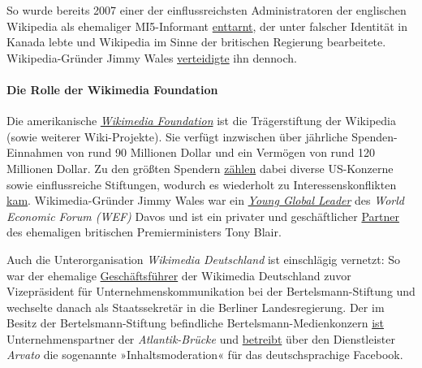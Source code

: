 So wurde bereits 2007 einer der einflussreichsten Administratoren der
englischen Wikipedia als ehemaliger MI5-Informant
\href{https://web.archive.org/web/20200528235242/http://english.ohmynews.com/articleview/article_view.asp?menu=c10400\&no=374006\&rel_no=1}{enttarnt},
der unter falscher Identität in Kanada lebte und Wikipedia im Sinne der
britischen Regierung bearbeitete. Wikipedia-Gründer Jimmy Wales
\href{https://gosint.wordpress.com/2018/06/02/wikipedia-the-spooks-the-remake-update-philip-cross-identified/}{verteidigte}
ihn dennoch.

\hypertarget{die-rolle-der-wikimedia-foundation}{%
\paragraph{Die Rolle der Wikimedia
Foundation}\label{die-rolle-der-wikimedia-foundation}}

Die amerikanische
\emph{\href{https://de.wikipedia.org/wiki/Wikimedia_Foundation}{Wikimedia
Foundation}} ist die Trägerstiftung der Wikipedia (sowie weiterer
Wiki-Projekte). Sie verfügt inzwischen über jährliche Spenden-Einnahmen
von rund 90 Millionen Dollar und ein Vermögen von rund 120 Millionen
Dollar. Zu den größten Spendern
\href{https://wikimediafoundation.org/support/benefactors/}{zählen}
dabei diverse US-Konzerne sowie einflussreiche Stiftungen, wodurch es
wiederholt zu Interessenskonflikten
\href{https://www.dailydot.com/business/wikipedia-conflict-editing-donation-benefactors/}{kam}.
Wiki­media-Gründer Jimmy Wales war ein
\href{http://reports.weforum.org/the-forum-of-young-global-leaders-2014/ygl-stories/crowdsourced/}{\emph{Young
Global Leader}} des \emph{World Economic Forum (WEF)} Davos und ist ein
privater und geschäftlicher
\href{http://wikipediocracy.com/2015/06/01/how-jimmy-wales-rode-tony-blairs-coattails/}{Partner}
des ehemaligen britischen Premierministers Tony Blair.

Auch die Unterorganisation \emph{Wikimedia Deutschland} ist einschlägig
vernetzt: So war der ehemalige
\href{https://de.wikipedia.org/wiki/Christian_Rickerts}{Geschäftsführer}
der Wikimedia Deutschland zuvor Vizepräsident für
Unter­nehmens­kommunikation bei der Bertelsmann-Stiftung und wechselte
danach als Staats­sekretär in die Berliner Landes­regierung. Der im
Besitz der Bertelsmann-Stiftung befindliche Bertelsmann-Medien­konzern
\href{https://www.bertelsmann.com/corporate-responsibility/facts-and-figures/cooperations/}{ist}
Unternehmenspartner der \emph{Atlantik-Brücke} und
\href{https://meedia.de/2018/02/15/facebook-polizei-bertelsmann-tochter-arvato-fahndet-fuer-us-plattform-auch-weiterhin-nach-verbotenen-inhalten/}{betreibt}
über den Dienstleister \emph{Arvato} die sogenannte »Inhaltsmoderation«
für das deutschsprachige Facebook.

